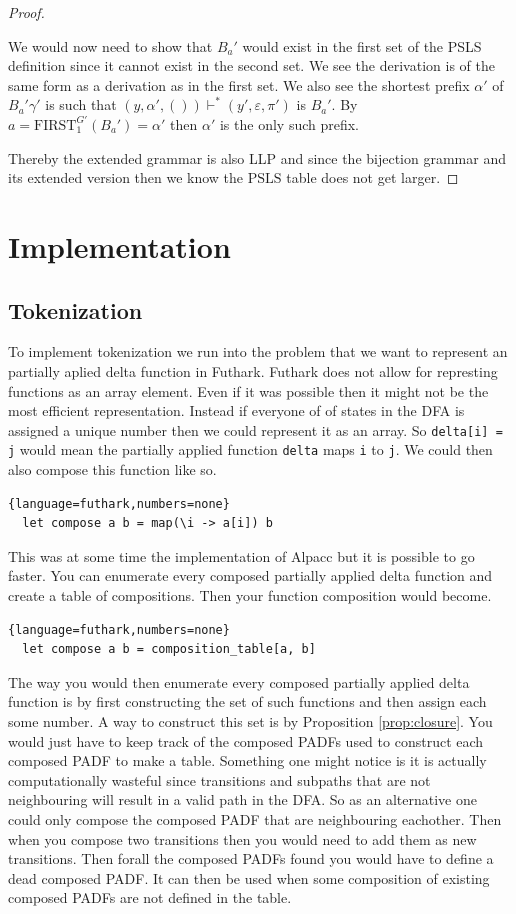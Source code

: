 \documentclass[a4paper,12pt]{article}
\newcommand\PSLS{\text{PSLS}}
\theoremstyle{definition}
\begin{document}
\begin{proof}
\begin{itemize}
    We would now need to show that $B_a'$ would exist in the first set of the PSLS definition since it cannot exist in the second set. We see the derivation is of the same form as a derivation as in the first set. We also see the shortest prefix $\alpha'$ of $B_a'\gamma'$ is such that $(y, \alpha', ()) \vdash^* (y', \varepsilon, \pi')$ is $B_a'$. By $a = \text{FIRST}^{G'}_1(B_a') = \alpha'$ then $\alpha'$ is the only such prefix.
  \end{itemize}
  Thereby the extended grammar is also LLP and since the bijection grammar and its extended version then we know the $\PSLS$ table does not get larger.
\end{proof}

\section{Implementation}
\subsection{Tokenization}
To implement tokenization we run into the problem that we want to represent an partially aplied delta function in Futhark. Futhark does not allow for represting functions as an array element. Even if it was possible then it might not be the most efficient representation. Instead if everyone of of states in the DFA is assigned a unique number then we could represent it as an array. So \texttt{delta[i] = j} would mean the partially applied function \texttt{delta} maps \texttt{i} to \texttt{j}. We could then also compose this function like so.
\begin{lstlisting}{language=futhark,numbers=none}
  let compose a b = map(\i -> a[i]) b
\end{lstlisting}
This was at some time the implementation of Alpacc but it is possible to go faster. You can enumerate every composed partially applied delta function and create a table of compositions. Then your function composition would become.
\begin{lstlisting}{language=futhark,numbers=none}
  let compose a b = composition_table[a, b]
\end{lstlisting}
The way you would then enumerate every composed partially applied delta function is by first constructing the set of such functions and then assign each some number. A way to construct this set is by Proposition \ref{prop:closure}. You would just have to keep track of the composed PADFs used to construct each composed PADF to make a table. Something one might notice is it is actually computationally wasteful since transitions and subpaths that are not neighbouring will result in a valid path in the DFA. So as an alternative one could only compose the composed PADF that are neighbouring eachother. Then when you compose two transitions then you would need to add them as new transitions. Then forall the composed PADFs found you would have to define a dead composed PADF. It can then be used when some composition of existing composed PADFs are not defined in the table.
\end{document}
